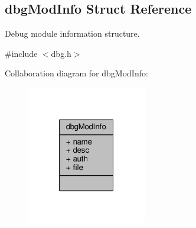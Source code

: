 \hypertarget{structdbgModInfo}{\subsection{dbg\-Mod\-Info Struct Reference}
\label{structdbgModInfo}
}


Debug module information structure.  




{\ttfamily \#include $<$dbg.\-h$>$}



Collaboration diagram for dbg\-Mod\-Info\-:\nopagebreak
\begin{figure}[H]
\begin{center}
\leavevmode
\includegraphics[width=148pt]{structdbgModInfo__coll__graph}
\end{center}
\end{figure}
